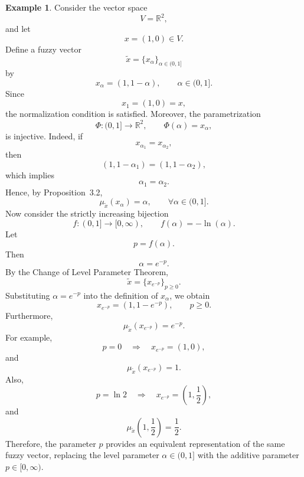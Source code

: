 \documentclass[preprint,12pt]{elsarticle}
\theoremstyle{definition}
\newtheorem{example}[theorem]{Example}
\begin{document}
\begin{example}
	Consider the vector space
	\[
	V=\mathbb{R}^{2},
	\]
	and let
	\[
	x=(1,0)\in V.
	\]
	Define a fuzzy vector
	\[
	\widetilde{x}
	=
	\{x_\alpha\}_{\alpha\in(0,1]}
	\]
	by
	\[
	x_\alpha=(1,1-\alpha),
	\qquad
	\alpha\in(0,1].
	\]
	Since
	\[
	x_1=(1,0)=x,
	\]
	the normalization condition is satisfied.
	Moreover, the parametrization
	\[
	\Phi:(0,1]\to\mathbb{R}^2,
	\qquad
	\Phi(\alpha)=x_\alpha,
	\]
	is injective. Indeed, if
	\[
	x_{\alpha_1}=x_{\alpha_2},
	\]
	then
	\[
	(1,1-\alpha_1)=(1,1-\alpha_2),
	\]
	which implies
	\[
	\alpha_1=\alpha_2.
	\]Hence, by Proposition~3.2,
	\[
	\mu_{\widetilde{x}}(x_\alpha)=\alpha,
	\qquad
	\forall \alpha\in(0,1].
	\]
	Now consider the strictly increasing bijection
	\[
	f:(0,1]\to [0,\infty),
	\qquad
	f(\alpha)=-\ln(\alpha).
	\]
	Let
	\[
	p=f(\alpha).
	\]
	Then
	\[
	\alpha=e^{-p}.
	\]
	By the Change of Level Parameter Theorem,
	\[
	\widetilde{x}
	=
	\{x_{e^{-p}}\}_{p\ge0}.
	\]Substituting \(\alpha=e^{-p}\) into the definition of \(x_\alpha\), we obtain
	\[
	x_{e^{-p}}
	=
	(1,1-e^{-p}),
	\qquad p\ge0.
	\]Furthermore,
	\[
	\mu_{\widetilde{x}}(x_{e^{-p}})
	=
	e^{-p}.
	\]For example,
	\[
	p=0
	\quad\Longrightarrow\quad
	x_{e^{-p}}=(1,0),
	\]
	and
	\[
	\mu_{\widetilde{x}}(x_{e^{-p}})=1.
	\]Also,
	\[
	p=\ln 2
	\quad\Longrightarrow\quad
	x_{e^{-p}}
	=
	\left(1,\frac12\right),
	\]
	and
	\[
	\mu_{\widetilde{x}}
	\left(
	1,\frac12
	\right)
	=
	\frac12.
	\]
	Therefore, the parameter \(p\) provides an equivalent representation of
	the same fuzzy vector, replacing the level parameter \(\alpha\in(0,1]\)
	with the additive parameter \(p\in[0,\infty)\).
\end{example}
\end{document}

